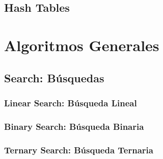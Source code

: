 \documentclass[12pt, fleqn]{report}                             %
\theoremstyle{break}                                            %
\begin{document}
    \chapter{Hash Tables}


\part{Algoritmos Generales}
    
    \clearpage
    \chapter{Search: Búsquedas}

        \section{Linear Search: Búsqueda Lineal}

        \section{Binary Search: Búsqueda Binaria}

        \section{Ternary Search: Búsqueda Ternaria}
\end{document}

